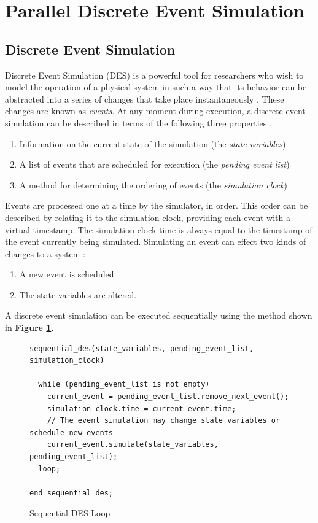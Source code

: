 \documentclass[11pt]{book}
\begin{document}
\section{\textbf{Parallel Discrete Event Simulation}}

\subsection{\textbf{Discrete Event Simulation}}

Discrete Event Simulation (DES) is a powerful tool for researchers who wish to
model the operation of a physical system in such a way that its behavior can be
abstracted into a series of changes that take place instantaneously
\cite{jacob-13}. These changes are known as \textit{events}. At any moment
during execution, a discrete event simulation can be described in terms of the
following three properties \cite{fujimoto-pdes} \cite{jacob-13} \cite{page-94}.

\begin{enumerate}
  \item Information on the current state of the simulation (the \textit{state variables})
  \item A list of events that are scheduled for execution (the \textit{pending
    event list})
  \item A method for determining the ordering of events (the \textit{simulation
    clock})
\end{enumerate}

Events are processed one at a time by the simulator, in order. This order can be
described by relating it to the simulation clock, providing each event with a
virtual timestamp. The simulation clock time is always equal to the timestamp of
the event currently being simulated. Simulating an event can effect two kinds of
changes to a system \cite{fujimoto-pdes}:

\begin{enumerate}
  \item A new event is scheduled.
  \item The state variables are altered.
\end{enumerate}

A discrete event simulation can be executed sequentially using the method shown
in \textbf{Figure \ref{sequential-des}}.

\begin{figure}[h]
\centering
\begin{verbatim}
sequential_des(state_variables, pending_event_list, simulation_clock)

  while (pending_event_list is not empty)
    current_event = pending_event_list.remove_next_event();
    simulation_clock.time = current_event.time;
    // The event simulation may change state variables or schedule new events
    current_event.simulate(state_variables, pending_event_list);
  loop;

end sequential_des;
\end{verbatim}
\caption{Sequential DES Loop \cite{jacob-13}}
\label{sequential-des}
\end{figure}
\end{document}
